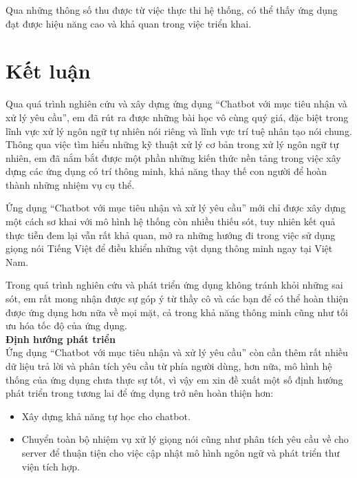 \documentclass[12pt]{report}
\newcommand{\app}{Chatbot với mục tiêu nhận và xử lý yêu cầu}
\begin{document}
Qua những thông số thu được từ việc thực thi hệ thống, có thể thấy ứng dụng đạt được hiệu năng cao và khả quan trong việc triển khai.

\stopcontents[parts]

\chapter*{Kết luận}

Qua quá trình nghiên cứu và xây dựng ứng dụng ``\app{}'', em đã rút ra được những bài học vô cùng quý giá, đặc biệt trong lĩnh vực xử lý ngôn ngữ tự nhiên nói riêng và lĩnh vực trí tuệ nhân tạo nói chung. Thông qua việc tìm hiểu những kỹ thuật xử lý cơ bản trong xử lý ngôn ngữ tự nhiên, em đã nắm bắt được một phần những kiến thức nền tảng trong việc xây dựng các ứng dụng có trí thông minh, khả năng thay thế con người để hoàn thành những nhiệm vụ cụ thể.

Ứng dụng ``\app{}'' mới chỉ được xây dựng một cách sơ khai với mô hình hệ thống còn nhiều thiếu sót, tuy nhiên kết quả thực tiễn đem lại vẫn rất khả quan, mở ra những hướng đi trong việc sử dụng giọng nói Tiếng Việt để điều khiển những vật dụng thông minh ngay tại Việt Nam.

Trong quá trình nghiên cứu và phát triển ứng dụng không tránh khỏi những sai sót, em rất mong nhận được sự góp ý từ thầy cô và các bạn để có thể hoàn thiện được ứng dụng hơn nữa về mọi mặt, cả trong khả năng thông minh cũng như tối ưu hóa tốc độ của ứng dụng. \\[0.4cm]
\noindent \textbf{\large Định hướng phát triển\\[0.4cm]}
Ứng dụng ``\app{}'' còn cần thêm rất nhiều dữ liệu trả lời và phân tích yêu cầu từ phía người dùng, hơn nữa, mô hình hệ thống của ứng dụng chưa thực sự tốt, vì vậy em xin đề xuất một số định hướng phát triển trong tương lai để ứng dụng trở nên hoàn thiện hơn:

\begin{itemize}
	\item Xây dựng khả năng tự học cho chatbot.
	\item Chuyển toàn bộ nhiệm vụ xử lý giọng nói cũng như phân tích yêu cầu về cho server để thuận tiện cho việc cập nhật mô hình ngôn ngữ và phát triển thư viện tích hợp.
\end{itemize}
\end{document}
